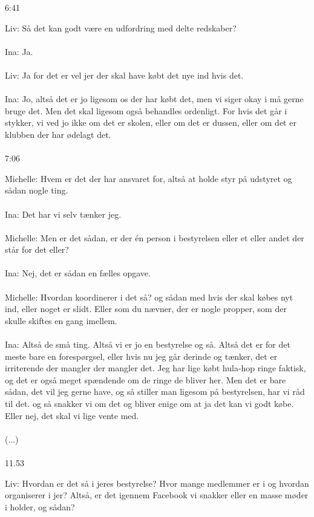 6:41
\par
Liv: Så det kan godt være en udfordring med delte redskaber?
\\\\
Ina: Ja.
\\\\
Liv: Ja for det er vel jer der skal have købt det nye ind hvis det.
\\\\
Ina: Jo, altså det er jo ligesom os der har købt det, men vi siger okay i må gerne bruge det. Men det skal ligesom også behandles ordenligt. For hvis det går i stykker, vi ved jo ikke om det er skolen, eller om det er dussen, eller om det er klubben der har ødelagt det. 
\\\\
7:06
\par
Michelle: Hvem er det der har ansvaret for, altså at holde styr på udstyret og sådan nogle ting. 
\\\\
Ina: Det har vi selv tænker jeg.
\\\\
Michelle: Men er det sådan, er der én person i bestyrelsen eller et eller andet der står for det eller?
\\\\
Ina: Nej, det er sådan en fælles opgave. 
\\\\
Michelle: Hvordan koordinerer i det så? og sådan med hvis der skal købes nyt ind, eller noget er slidt. Eller som du nævner, der er nogle propper, som der skulle skiftes en gang imellem.
\\\\
Ina: Altså de små ting. Altså vi er jo en bestyrelse og så. Altså det er for det meste bare en forespørgsel, eller hvis nu jeg går derinde og tænker, det er irriterende der mangler der mangler det. Jeg har lige købt hula-hop ringe faktisk, og det er også meget spændende om de ringe de bliver her. Men det er bare sådan, det vil jeg gerne have, og så stiller man ligesom på bestyrelsen, har vi råd til det. og så snakker vi om det og bliver enige om at ja det kan vi godt købe. Eller nej, det skal vi lige vente med. 
\\\\
(...)
\\\\
11.53
\par
Liv: Hvordan er det så i jeres bestyrelse? Hvor mange medlemmer er i og hvordan organiserer i jer? Altså, er det igennem Facebook vi snakker eller en masse møder i holder, og sådan?

